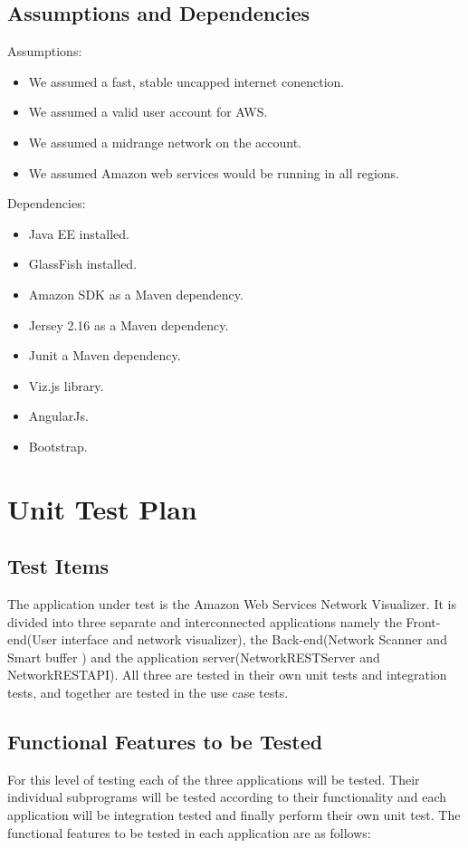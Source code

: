 \documentclass[hidelinks,a4paper,12pt]{article}
\begin{document}
\subsection{Assumptions and Dependencies}
Assumptions:
\begin{itemize}
  \item We assumed a fast, stable uncapped internet conenction.
  \item We assumed a valid user account for AWS.
\item We assumed a midrange network on the account.
\item We assumed Amazon web services would be running in all regions.
\end{itemize}
Dependencies:
\begin{itemize}
  \item Java EE installed.
  \item GlassFish installed.
\item Amazon SDK as a Maven dependency.
\item Jersey 2.16 as a Maven dependency.
\item Junit a Maven dependency.
\item Viz.js library.
\item AngularJs.
\item Bootstrap.
\end{itemize}
\newpage
\section{Unit Test Plan}

\subsection{Test Items}
The application under test is the Amazon Web Services Network Visualizer. It is divided into three separate and interconnected applications namely the Front-end(User interface and network visualizer), the Back-end(Network Scanner and Smart buffer ) and the application server(NetworkRESTServer and NetworkRESTAPI). All three are tested in their own unit tests and integration tests, and together are tested in the use case tests.
 
\subsection{Functional Features to be Tested}  
For this level of testing each of the three applications will be tested. Their individual subprograms will be tested according to their functionality and each application will be integration tested and finally perform their own unit test. The functional features to be tested in each application are as follows:
\end{document}

